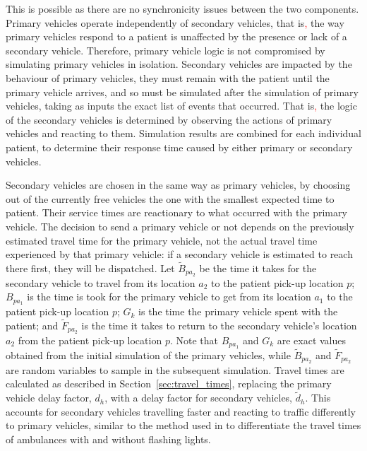 \documentclass[numbers,webpdf,imaman]{ima-authoring-template}%
\begin{document}
This is possible as there are no synchronicity issues between the two
components. Primary vehicles operate independently of secondary vehicles, that
is\textcolor{red}{,} the way primary vehicles respond to a patient is unaffected by the presence
or lack of a secondary vehicle.
Therefore, primary vehicle logic is not compromised by simulating primary
vehicles in isolation.
Secondary vehicles are impacted by the behaviour of primary vehicles, they
must remain with the patient until the primary vehicle arrives, and so must be
simulated after the simulation of primary vehicles, taking as inputs the exact
list of events that occurred. That is\textcolor{red}{,} the logic of the secondary vehicles is
determined by observing the actions of primary vehicles and reacting to them.
Simulation results are combined for each individual patient, to determine
their response time caused by either primary or secondary vehicles.

Secondary vehicles are chosen in the same way as primary vehicles, by choosing
out of the currently free vehicles the one with the smallest expected time to
patient. Their service times are reactionary to what occurred with the primary
vehicle. The decision to send a primary vehicle or not depends on the previously
estimated travel time for the primary vehicle, not the actual travel time
experienced by that primary vehicle: if a secondary vehicle is estimated to
reach there first, they will be dispatched.
Let $\tilde{B}_{pa_2}$ be the time it takes for the secondary vehicle to travel
from its location $a_2$ to the patient pick-up location $p$; $B_{pa_1}$ is the
time is took for the primary vehicle to get from its location $a_1$ to the
patient pick-up location $p$; $G_k$ is the time the primary vehicle spent
with the patient; and $\tilde{F}_{pa_2}$ is the time it takes to return to the
secondary vehicle's location $a_2$ from the patient pick-up location $p$.
Note that $B_{pa_1}$ and $G_k$ are exact values obtained from the
initial simulation of the primary vehicles, while $\tilde{B}_{pa_2}$ and
$\tilde{F}_{pa_2}$ are random variables to sample in the subsequent simulation.
Travel times are calculated as described in Section~\ref{sec:travel_times},
replacing the primary vehicle delay factor, $d_h$, with a delay factor for
secondary vehicles, $\tilde{d}_h$. This accounts for secondary vehicles
travelling faster and reacting to traffic differently to primary vehicles,
similar to the method used in \citet{hendersonmason04} to differentiate the
travel times of ambulances with and without flashing lights.
\end{document}
